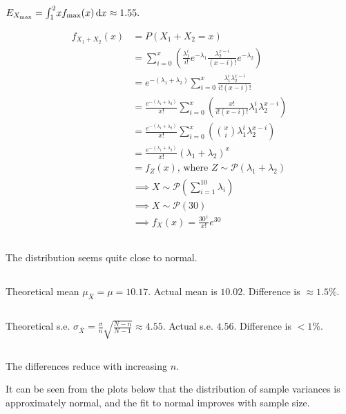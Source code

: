 \documentclass[twocolumn]{article}
\newcommand{\fmax}{f_{\text{max}}}
\newcommand{\lo}{\lambda_1}
\newcommand{\lt}{\lambda_2}
\begin{document}
\subsection{}
$E_{X_{\text{max}}}=\intg{1}{2}{x\fmax(x)}{x}\approx 1.55.$

\begin{align*}
f_{X_1+X_2}(x)&=P(X_1+X_2=x)\\
&=\sum_{i=0}^x\left(
	\frac{\lo^i}{i!}e^{-\lo}
	\frac{\lt^{x-i}}{(x-i)!}e^{-\lt}
\right)\\
&=e^{-(\lo+\lt)}\sum_{i=0}^x\frac{
	\lo^i\lt^{x-i}
}{
	i!(x-i)!
}\\
&=\frac{e^{-(\lo+\lt)}}{x!}
\sum_{i=0}^x\left(
	\frac{x!}{i!(x-i)!}
	\lo^i\lt^{x-i}
\right)\\
&=\frac{e^{-(\lo+\lt)}}{x!}
\sum_{i=0}^x\left(
	\binom{x}{i}
	\lo^i\lt^{x-i}
\right)\\
&=\frac{e^{-(\lo+\lt)}}{x!}(\lo+\lt)^x\\
&=f_Z(x)\text{, where }Z\sim\mathcal{P}(\lo+\lt)
\end{align*}\begin{align*}
&\implies X\sim\mathcal{P}\left(\sum_{i=1}^{10}\lambda_i\right)\\
&\implies X\sim\mathcal{P}(30)\\
&\implies f_X(x)=\frac{30^x}{x!}e^{30}
\end{align*}

\subsection{} The distribution seems quite close to normal.
\subsection{}
Theoretical mean $\mu_{\overline{X}}=\mu=10.17$. Actual mean is $10.02$. Difference is $\approx1.5\%$.
\subsection{}
Theoretical s.e. $\sigma_{\overline{X}}=\frac{\sigma}{n}\sqrt{\frac{N-n}{N-1}}\approx4.55$. Actual s.e. $4.56$. Difference is $<1\%$.
\subsection{}
The differences reduce with increasing $n$.

It can be seen from the plots below that the distribution of sample variances is approximately normal, and the fit to normal improves with sample size.
\end{document}
